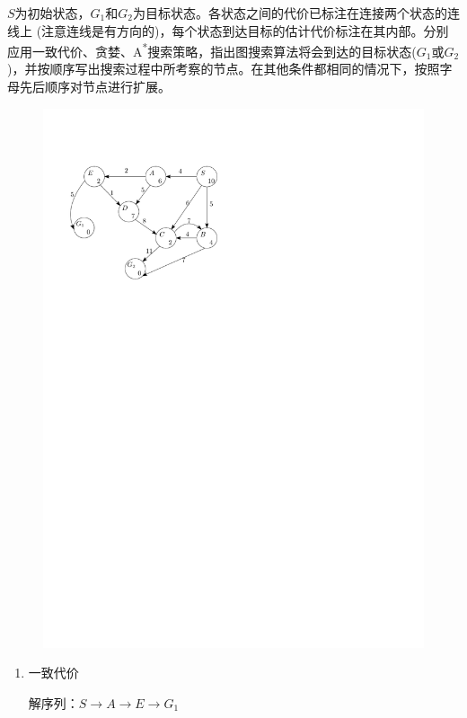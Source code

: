 \begin{example}
    $S$为初始状态，$G_1$和$G_2$为目标状态。各状态之间的代价已标注在连接两个状态的连线上 (注意连线是有方向的)，每个状态到达目标的估计代价标注在其内部。分别应用\textcolor{main1}{一致代价、贪婪、A\textsuperscript{*}搜索策略}，指出图搜索算法将会到达的目标状态($G_1$或$G_2$)，并按顺序写出搜索过程中所考察的节点。在其他条件都相同的情况下，按照字母先后顺序对节点进行扩展。
    \begin{figure}[htbp]
        \centering
        \includegraphics{image/搜索策略例题.pdf}
    \end{figure}
    \begin{enumerate}
        \item 一致代价
        
        \textcolor{main1}{解序列：}$S\to A\to E\to G_1$


\end{enumerate}
\end{example}
